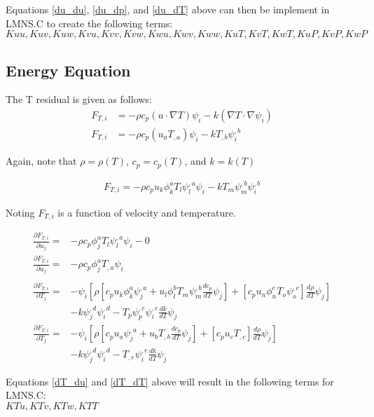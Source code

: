Equations \ref{du_du}, \ref{du_dp}, and \ref{du_dT} above can then be implement in LMNS.C to create the following terms:\\
$Kuu, Kuv, Kuw, Kvu, Kvv, Kvw, Kwu, Kwv, Kww, KuT, KvT, KwT, KuP, KvP, KwP$

\newpage
\subsection{Energy Equation}
The T residual is given as follows:
\begin{align}
    F_{T,i} &= -\rho c_p (u \cdot \nabla T) \psi_i - k ( \nabla T \cdot \nabla \psi_i) \\
    F_{T,i} &= -\rho c_p (u_a T_{,a})\psi_i - k T_{,b} \psi_i^{,b}
\end{align}

Again, note that $\rho = \rho(T)$, $c_p = c_p(T)$, and $k = k(T)$

\begin{align}
    F_{T,i} = -\rho c_p u_k \phi_k^a T_l \psi_l^{,a} \psi_i - k T_m \psi_m^{,b} \psi_i^{,b}
\end{align}

Noting $F_{T,i}$ is a function of velocity and temperature.

\begin{align}
    \frac{\partial F_{T,i}}{\partial u_j} = &-\rho c_p \phi_j^a T_l \psi_l^{,a} \psi_i - 0 \nonumber \\
    \frac{\partial F_{T,i}}{\partial u_j} = &-\rho c_p \phi_j^a T_{,a} \psi_i \label{dT_du} \\
    \nonumber \\
    \frac{\partial F_{T,i}}{\partial T_j} = &-\psi_i \left [ \rho [ c_p u_k \phi_k^a \psi_j^{,a} + u_l \phi_l^b T_m \psi_m^{,b} \frac{d c_p}{dT} \psi_j ] + 
    [ c_p u_n \phi_n^{c} T_o \psi_o^{,c} ] \frac{d \rho}{dT} \psi_j  \right ] \nonumber \\
                                      &- k \psi_j^{,d} \psi_i^{,d} - T_p \psi_p^{,e} \psi_i^{,e} \frac{dk}{dT} \psi_j \nonumber \\
    \frac{\partial F_{T,i}}{\partial T_j} = &-\psi_i \left [ \rho [ c_p u_a \psi_j^{,a} + u_b T_{,b} \frac{d c_p}{dT} \psi_j ] + 
    [ c_p u_c T_{,c} ] \frac{d \rho}{dT} \psi_j  \right ] \nonumber \\
                                      &- k \psi_j^{,d} \psi_i^{,d} - T_{,e} \psi_i^{,e} \frac{dk}{dT} \psi_j \label{dT_dT}
\end{align}

Equations \ref{dT_du} and \ref{dT_dT} above will result in the following terms for LMNS.C:\\
$KTu, KTv, KTw, KTT$


